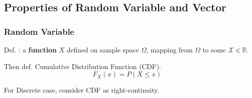 \subsection{Properties of Random Variable and Vector}\label{SectionPropertiesOfRandomVariableAndVector}

\subsubsection{Random Variable}
    Def. : a \textbf{function} $X$ defined on sample space $\Omega$, mapping from $\Omega$ to some $\mathscr{X}\in\mathbb{R} $.

    Then def. Cumulative Distribution Function (CDF).
    \[
        F_X(x)=P(X\leq x)
    \]

    For Discrete case, consider CDF as right-continuity.

